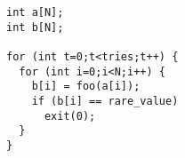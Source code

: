 \begin{lstlisting}[morekeywords={g_qCount},belowskip=0pt]
int a[N];
int b[N];

for (int t=0;t<tries;t++) {
  for (int i=0;i<N;i++) {
    b[i] = foo(a[i]);
    if (b[i] == rare_value)
      exit(0);
  }
}
\end{lstlisting}

